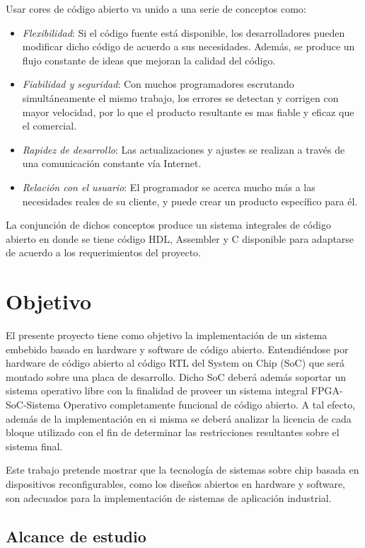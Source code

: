 Usar cores de código abierto va unido a una serie de conceptos como:
\begin{itemize}
\item \textit{Flexibilidad}: Si el código fuente está disponible, los
  desarrolladores pueden modificar dicho código de acuerdo a sus
  necesidades. Además, se produce un flujo constante de ideas que
  mejoran la calidad del código.
\item \textit{Fiabilidad y seguridad}: Con muchos programadores
  escrutando simultáneamente el mismo trabajo, los errores se detectan
  y corrigen con mayor velocidad, por lo que el producto resultante es
  mas fiable y eficaz que el comercial.
\item \textit{Rapidez de desarrollo}: Las actualizaciones y ajustes se
  realizan a través de una comunicación constante vía Internet.
\item \textit{Relación con el usuario}: El programador se acerca mucho
  más a las necesidades reales de su cliente, y puede crear un
  producto específico para él.
\end{itemize}

La conjunción de dichos conceptos produce un sistema integrales de
código abierto en donde se tiene código HDL, Assembler y C disponible
para adaptarse de acuerdo a los requerimientos del proyecto.

\section{Objetivo}

El presente proyecto tiene como objetivo la implementación de un
sistema embebido basado en hardware y software de código
abierto. Entendiéndose por hardware de código abierto al código RTL
del System on Chip (SoC) que será montado sobre una placa de desarrollo.
Dicho SoC deberá además soportar un sistema operativo
libre con la finalidad de proveer un sistema integral FPGA-SoC-Sistema
Operativo completamente funcional de código abierto. A tal efecto,
además de la implementación en si misma se deberá analizar la licencia
de cada bloque utilizado con el fin de determinar las restricciones
resultantes sobre el sistema final.

Este trabajo pretende mostrar que la tecnología de sistemas sobre chip
basada en dispositivos reconfigurables, como los diseños abiertos en
hardware y software, son adecuados para la implementación de sistemas
de aplicación industrial.

\subsection{Alcance de estudio}

